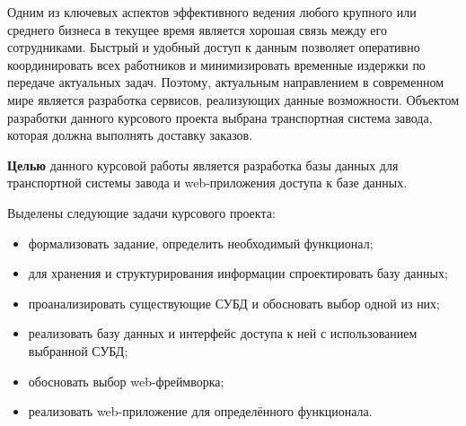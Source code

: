 Одним из ключевых аспектов эффективного ведения любого крупного или среднего бизнеса в текущее время является хорошая связь между его сотрудниками. Быстрый и удобный доступ к данным позволяет оперативно координировать всех работников и минимизировать временные издержки по передаче актуальных задач. Поэтому, актуальным направлением в современном мире является разработка сервисов, реализующих данные возможности. Объектом разработки данного курсового проекта выбрана транспортная система завода, которая должна выполнять доставку заказов.

\textbf{Целью} данного курсовой работы является разработка базы данных для транспортной системы завода и web-приложения доступа к базе данных.

Выделены следующие задачи курсового проекта:
\begin{itemize}
	\item формализовать задание, определить необходимый функционал;
	\item для хранения и структурирования информации спроектировать базу данных;
	\item проанализировать существующие СУБД и обосновать выбор одной из них;
	\item реализовать базу данных и интерфейс доступа к ней с использованием выбранной СУБД;
	\item обосновать выбор web-фреймворка;
	\item реализовать web-приложение для определённого функционала.
\end{itemize}
